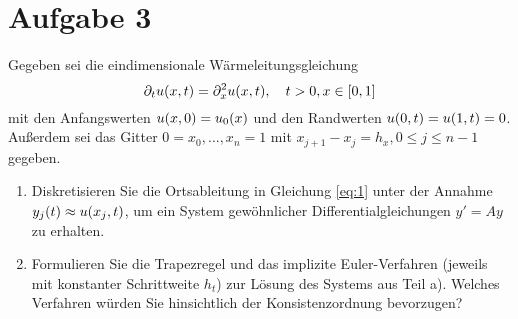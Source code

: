 \documentclass{exercise}
\begin{document}
    \section*{Aufgabe 3}
    
    \begin{problem}
        Gegeben sei die eindimensionale Wärmeleitungsgleichung
        \begin{equation}\label{eq:1}
            \partial_t u\parentheses*{x, t} = \partial_x^2 u\parentheses*{x, t}, \quad t > 0, x \in \brackets*{0, 1}
        \end{equation}
        mit den Anfangswerten \(u\parentheses*{x, 0} = u_0\parentheses*{x}\) und den Randwerten \(u\parentheses*{0, t} = u\parentheses*{1, t} = 0\).
        Außerdem sei das Gitter \(0 = x_0, \ldots, x_n = 1\) mit \(x_{j + 1} - x_j = h_x, 0 \le j \le n - 1\) gegeben.
        \begin{enumerate}
            \item Diskretisieren Sie die Ortsableitung in Gleichung \eqref{eq:1} unter der Annahme \(y_j\parentheses*{t} \approx u\parentheses*{x_j, t}\), um ein System gewöhnlicher Differentialgleichungen \(y' = Ay\) zu erhalten.
            \item Formulieren Sie die Trapezregel und das implizite Euler-Verfahren (jeweils mit konstanter Schrittweite \(h_t\)) zur Lösung des Systems aus Teil a).
            Welches Verfahren würden Sie hinsichtlich der Konsistenzordnung bevorzugen?
        \end{enumerate}
    \end{problem}
    
\end{document}
